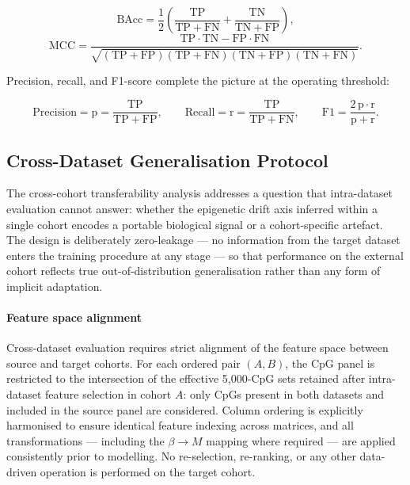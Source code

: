 \begin{equation}
\mathrm{BAcc} = \frac{1}{2}\!\left(
  \frac{\mathrm{TP}}{\mathrm{TP}+\mathrm{FN}} +
  \frac{\mathrm{TN}}{\mathrm{TN}+\mathrm{FP}}
\right),
\end{equation}
\begin{equation}
\mathrm{MCC} =
\frac{\mathrm{TP}\cdot\mathrm{TN} - \mathrm{FP}\cdot\mathrm{FN}}
{\sqrt{(\mathrm{TP}+\mathrm{FP})(\mathrm{TP}+\mathrm{FN})
       (\mathrm{TN}+\mathrm{FP})(\mathrm{TN}+\mathrm{FN})}}.
\end{equation}

Precision, recall, and F1-score complete the picture at the
operating threshold:

\begin{equation}
\mathrm{Precision} = \mathrm{p} = \frac{\mathrm{TP}}{\mathrm{TP}+\mathrm{FP}},
\qquad
\mathrm{Recall} = \mathrm{r} = \frac{\mathrm{TP}}{\mathrm{TP}+\mathrm{FN}},
\qquad
\mathrm{F1} = \frac{2\,\mathrm{p}\cdot\mathrm{r}}
              {\mathrm{p}+\mathrm{r}}.
\end{equation}

\subsection{Cross-Dataset Generalisation Protocol}
\label{sec:cross_dataset}

The cross-cohort transferability analysis addresses a question
that intra-dataset evaluation cannot answer: whether the
epigenetic drift axis inferred within a single cohort encodes
a portable biological signal or a cohort-specific artefact.
The design is deliberately zero-leakage — no information from
the target dataset enters the training procedure at any stage
— so that performance on the external cohort reflects true
out-of-distribution generalisation rather than any form of
implicit adaptation.

\paragraph{Feature space alignment}

Cross-dataset evaluation requires strict alignment of the
feature space between source and target cohorts. For each
ordered pair $(A, B)$, the CpG panel is restricted to the
intersection of the effective 5,000-CpG sets retained after
intra-dataset feature selection in cohort $A$: only CpGs
present in both datasets and included in the source panel are
considered. Column ordering is explicitly harmonised to ensure
identical feature indexing across matrices, and all
transformations — including the $\beta \to M$ mapping where
required — are applied consistently prior to modelling. No
re-selection, re-ranking, or any other data-driven operation
is performed on the target cohort.

